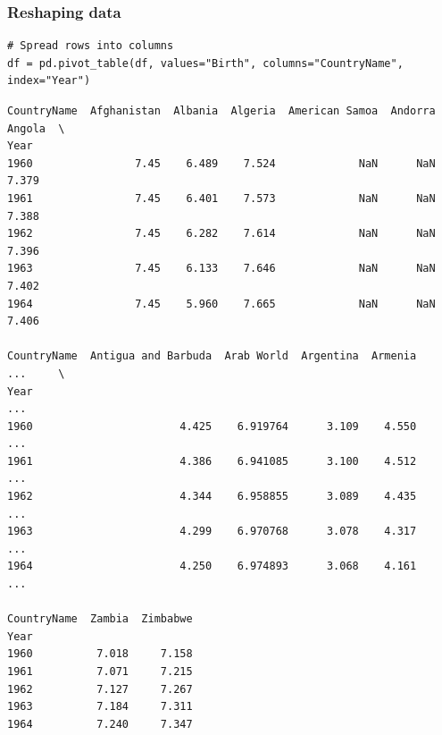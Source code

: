 \documentclass[pdf]{beamer}
\begin{document}
\begin{frame}[fragile]
\frametitle{Reshaping data}

\begin{lstlisting}[style=python]
# Spread rows into columns
df = pd.pivot_table(df, values="Birth", columns="CountryName", index="Year")
\end{lstlisting}

{\fontsize{7}{7}\selectfont
\begin{verbatim}
CountryName  Afghanistan  Albania  Algeria  American Samoa  Andorra  Angola  \
Year                                                                          
1960                7.45    6.489    7.524             NaN      NaN   7.379   
1961                7.45    6.401    7.573             NaN      NaN   7.388   
1962                7.45    6.282    7.614             NaN      NaN   7.396   
1963                7.45    6.133    7.646             NaN      NaN   7.402   
1964                7.45    5.960    7.665             NaN      NaN   7.406   

CountryName  Antigua and Barbuda  Arab World  Argentina  Armenia    ...     \
Year                                                                ...      
1960                       4.425    6.919764      3.109    4.550    ...      
1961                       4.386    6.941085      3.100    4.512    ...      
1962                       4.344    6.958855      3.089    4.435    ...      
1963                       4.299    6.970768      3.078    4.317    ...      
1964                       4.250    6.974893      3.068    4.161    ...      

CountryName  Zambia  Zimbabwe  
Year                           
1960          7.018     7.158  
1961          7.071     7.215  
1962          7.127     7.267  
1963          7.184     7.311  
1964          7.240     7.347 
\end{verbatim}}
\end{frame}
\end{document}
